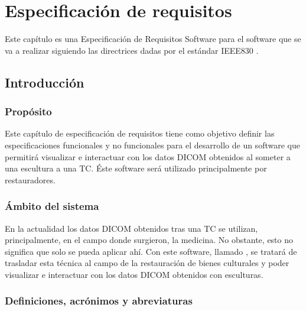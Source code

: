 \chapter{Especificación de requisitos}

Este capítulo es una Especificación de Requisitos Software para el software que se va a realizar siguiendo las directrices dadas por el estándar IEEE830 \cite{iee830}.

\section{Introducción}

	\subsection{Propósito}
	
	Este capítulo de especificación de requisitos tiene como objetivo definir las especificaciones funcionales y no funcionales para el desarrollo de un software que permitirá visualizar e interactuar con los datos DICOM obtenidos al someter a una escultura a una TC. Éste software será utilizado principalmente por restauradores.
	
	\subsection{Ámbito del sistema}
	
	En la actualidad los datos DICOM obtenidos tras una TC se utilizan, principalmente, en el campo donde surgieron, la medicina. No obstante, esto no significa que solo se pueda aplicar ahí. Con este software, llamado \myTitle, se tratará de trasladar esta técnica al campo de la restauración de bienes culturales y poder visualizar e interactuar con los datos DICOM obtenidos con esculturas.
	
	\subsection{Definiciones, acrónimos y abreviaturas}
	
